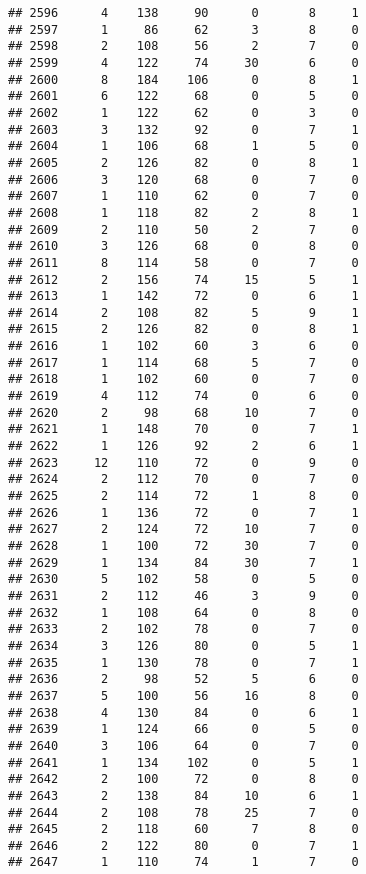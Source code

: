 \documentclass[
]{article}
\begin{document}
\begin{verbatim}
## 2596      4    138     90      0       8     1
## 2597      1     86     62      3       8     0
## 2598      2    108     56      2       7     0
## 2599      4    122     74     30       6     0
## 2600      8    184    106      0       8     1
## 2601      6    122     68      0       5     0
## 2602      1    122     62      0       3     0
## 2603      3    132     92      0       7     1
## 2604      1    106     68      1       5     0
## 2605      2    126     82      0       8     1
## 2606      3    120     68      0       7     0
## 2607      1    110     62      0       7     0
## 2608      1    118     82      2       8     1
## 2609      2    110     50      2       7     0
## 2610      3    126     68      0       8     0
## 2611      8    114     58      0       7     0
## 2612      2    156     74     15       5     1
## 2613      1    142     72      0       6     1
## 2614      2    108     82      5       9     1
## 2615      2    126     82      0       8     1
## 2616      1    102     60      3       6     0
## 2617      1    114     68      5       7     0
## 2618      1    102     60      0       7     0
## 2619      4    112     74      0       6     0
## 2620      2     98     68     10       7     0
## 2621      1    148     70      0       7     1
## 2622      1    126     92      2       6     1
## 2623     12    110     72      0       9     0
## 2624      2    112     70      0       7     0
## 2625      2    114     72      1       8     0
## 2626      1    136     72      0       7     1
## 2627      2    124     72     10       7     0
## 2628      1    100     72     30       7     0
## 2629      1    134     84     30       7     1
## 2630      5    102     58      0       5     0
## 2631      2    112     46      3       9     0
## 2632      1    108     64      0       8     0
## 2633      2    102     78      0       7     0
## 2634      3    126     80      0       5     1
## 2635      1    130     78      0       7     1
## 2636      2     98     52      5       6     0
## 2637      5    100     56     16       8     0
## 2638      4    130     84      0       6     1
## 2639      1    124     66      0       5     0
## 2640      3    106     64      0       7     0
## 2641      1    134    102      0       5     1
## 2642      2    100     72      0       8     0
## 2643      2    138     84     10       6     1
## 2644      2    108     78     25       7     0
## 2645      2    118     60      7       8     0
## 2646      2    122     80      0       7     1
## 2647      1    110     74      1       7     0

\end{verbatim}
\end{document}
